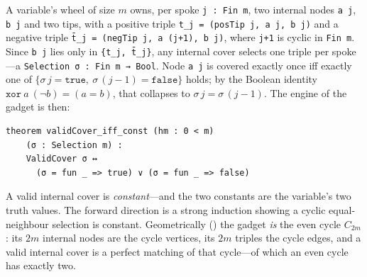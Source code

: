 \documentclass[sigplan,review,anonymous]{acmart}
\begin{document}
A variable's wheel of size $m$ owns, per spoke \lstinline{j : Fin m}, two internal nodes \lstinline{a j},
\lstinline{b j} and two tips, with a positive triple \lstinline{t_j = (posTip j, a j, b j)} and a negative
triple \lstinline{t̄_j = (negTip j, a (j+1), b j)}, where \lstinline{j+1} is cyclic in \lstinline{Fin m}. Since
\lstinline{b j} lies only in \lstinline|{t_j, t̄_j}|, any internal cover selects one triple per spoke---a
\lstinline{Selection σ : Fin m → Bool}. Node \lstinline{a j} is covered exactly once iff exactly one of
$\{\sigma\,j = \mathtt{true},\ \sigma\,(j{-}1) = \mathtt{false}\}$ holds; by the Boolean identity
$\mathtt{xor}\ a\ (\lnot b) = (a = b)$, that collapses to $\sigma\,j = \sigma\,(j{-}1)$. The engine of the
gadget is then:
\begin{lstlisting}[style=leandisplay]
theorem validCover_iff_const (hm : 0 < m)
    (σ : Selection m) :
    ValidCover σ ↔
      (σ = fun _ => true) ∨ (σ = fun _ => false)
\end{lstlisting}
A valid internal cover is \emph{constant}---and the two constants are the variable's two truth values. The
forward direction is a strong induction showing a cyclic equal-neighbour selection is constant. Geometrically
() the gadget \emph{is} the even cycle $C_{2m}$: its $2m$ internal nodes are the cycle
vertices, its $2m$ triples the cycle edges, and a valid internal cover is a perfect matching of that
cycle---of which an even cycle has exactly two.
\end{document}
